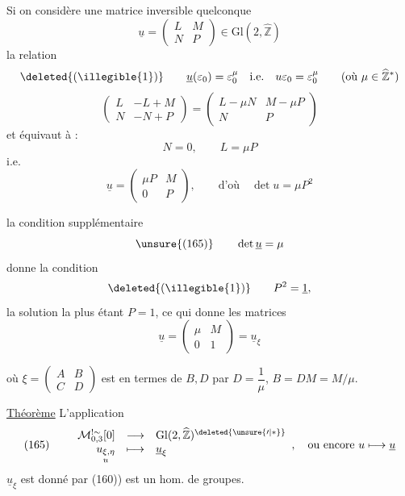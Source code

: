 Si on considère une matrice inversible quelconque
\[
\underline u=\begin{pmatrix}L&M\\N&P\end{pmatrix}
\in\mathrm{Gl}(2,\widehat{\mathbb Z})
\]
la relation
\[
\deleted{(\illegible{1})}\qquad
\underline u(\varepsilon_0)=\varepsilon_0^\mu
\quad\text{i.e.}\quad
u\varepsilon_0=\varepsilon_0^\mu
\qquad(\text{où }\mu\in\widehat{\mathbb Z}^{*})
\]
\[
\begin{pmatrix}L&-L+M\\N&-N+P\end{pmatrix}
=\begin{pmatrix}L-\mu N&M-\mu P\\N&P\end{pmatrix}
\]
et équivaut à : 
\[
N=0,\qquad L=\mu P
\]
i.e.
\[
\underline u=\begin{pmatrix}\mu P&M\\0&P\end{pmatrix},
\qquad\text{d'où}\quad\det u=\mu P^2
\]

la condition supplémentaire
\[
\unsure{(165)}\qquad \det\underline u=\mu
\]
donne la condition
\[
\deleted{(\illegible{1})}\qquad P^2=\underline 1,
\]
la solution la plus  étant $P=1$,
ce qui donne  les matrices
\[
\underline u=\begin{pmatrix}\mu&M\\0&1\end{pmatrix}
=\underline u_\xi
\]


où $\xi=\begin{pmatrix}A&B\\C&D\end{pmatrix}$
 est  en termes de
$B,D$ par $D=\dfrac1\mu$, $B=DM=M/\mu$.

\uline{Théorème} L'application
\[
(165)\qquad
\begin{array}{rcl}
\mathcal M_{0,3}^{!\sim}[0]&\longrightarrow&
\mathrm{Gl}(2,\widehat{\mathbb Z})^{\deleted{\unsure{\prime|*}}}\\
\underset{u}{u_{\xi,\eta}}&\longmapsto&\underline u_\xi
\end{array},
\quad\text{ou encore }u\longmapsto\underline u
\]
$\underline u_\xi$ est donné par (160)) est un hom. de groupes.



